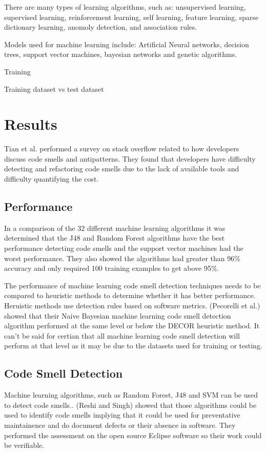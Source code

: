 \documentclass[conference]{IEEEtran}
\begin{document}
There are many types of learning algorithms, such as: unsupervised learning, supervised learning, reinforcement learning, self learning, feature learning, sparse dictionary learning, anomoly detection, and association rules.

Models used for machine learning include: Artificial Neural networks, decision trees, support vector machines, bayesian networks and genetic algorithms.

Training

Training dataset vs test dataset

\section{Results}
Tian et al.\cite{tian_how_2019} performed a survey on stack overflow related to how developers discuss code smells and antipatterns. They found that developers have difficulty detecting and refactoring code smells due to the lack of available tools and difficulty quantifying the cost.
\subsection{Performance}
In a comparison of the 32 different machine learning algorithms\cite{arcelli_fontana_comparing_2016} it was determined that the J48 and Random Forest algorithms have the best performance detecting code smells and the support vector machines had the worst performance. They also showed the algorithms had greater than 96\% accuracy and only required 100 training examples to get above 95\%.

The performance of machine learning code smell detection techniques needs to be compared to heuristic methods to determine whether it has better performance. Heruistic methods use detection rules based on software metrics. (Pecorelli et al.) showed\cite{pecorelli_comparing_2019} that their Naive Bayesian machine learning code smell detection algorithm performed at the same level or below the DECOR heuristic method. 
It can't be said for certian that all machine learning code smell detection will perform at that level as it may be due to the datasets used for training or testing.
\subsection{Code Smell Detection}
Machine learning algorithms, such as Random Forest, J48 and SVM can be used to detect code smells.\cite{reshi_investigating_2019}. (Reshi and Singh) showed that those algorithms could be used to identify code smells implying that it could be used for preventative maintainence and do document defects or their absence in software. They performed the assessment on the open source Eclipse software so their work could be verifiable.
\end{document}
